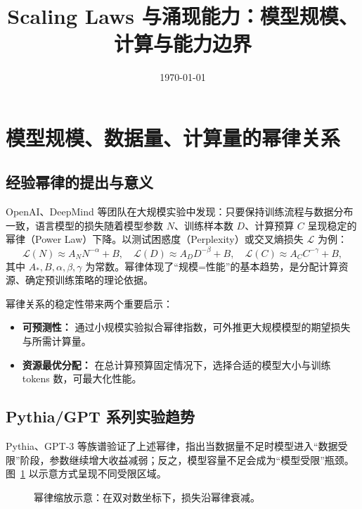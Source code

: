 \documentclass[UTF8,zihao=-4]{ctexart}
\title{Scaling Laws 与涌现能力：模型规模、计算与能力边界}
\author{}
\date{\today}
\begin{document}
\maketitle

\section{模型规模、数据量、计算量的幂律关系}
\subsection{经验幂律的提出与意义}
OpenAI、DeepMind 等团队在大规模实验中发现：只要保持训练流程与数据分布一致，语言模型的损失随着模型参数 $N$、训练样本数 $D$、计算预算 $C$ 呈现稳定的幂律（Power Law）下降。以测试困惑度（Perplexity）或交叉熵损失 $\mathcal{L}$ 为例：
\begin{equation}
  \mathcal{L}(N) \approx A_N N^{-\alpha} + B, \quad
  \mathcal{L}(D) \approx A_D D^{-\beta} + B, \quad
  \mathcal{L}(C) \approx A_C C^{-\gamma} + B,
\end{equation}
其中 $A_\ast, B, \alpha, \beta, \gamma$ 为常数。幂律体现了“规模=性能”的基本趋势，是分配计算资源、确定预训练策略的理论依据。

幂律关系的稳定性带来两个重要启示：
\begin{itemize}
  \item \textbf{可预测性：} 通过小规模实验拟合幂律指数，可外推更大规模模型的期望损失与所需计算量。
  \item \textbf{资源最优分配：} 在总计算预算固定情况下，选择合适的模型大小与训练 tokens 数，可最大化性能。
\end{itemize}

\subsection{Pythia/GPT 系列实验趋势}
Pythia、GPT-3 等族谱验证了上述幂律，指出当数据量不足时模型进入“数据受限”阶段，参数继续增大收益减弱；反之，模型容量不足会成为“模型受限”瓶颈。图~\ref{fig:power_law_placeholder_cn} 以示意方式呈现不同受限区域。

\begin{figure}[H]
  \centering
  \caption{幂律缩放示意：在双对数坐标下，损失沿幂律衰减。}
  \label{fig:power_law_placeholder_cn}
\end{figure}
\FloatBarrier
\end{document}

